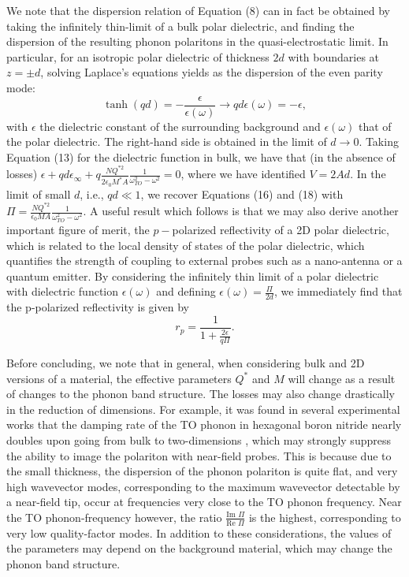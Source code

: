 \documentclass[superscriptaddress,reprint,prb]{revtex4-1}
\begin{document}
We note that the dispersion relation of Equation (8) can in fact be obtained by taking the infinitely thin-limit of a bulk polar dielectric, and finding the dispersion of the resulting phonon polaritons in the quasi-electrostatic limit. In particular, for an isotropic polar dielectric of thickness $2d$ with boundaries at $z=\pm d$, solving Laplace's equations yields as the dispersion of the even parity mode:
\begin{equation}
\tanh(qd) = -\frac{\epsilon}{\epsilon(\omega)} \rightarrow qd\epsilon(\omega) = -\epsilon,
\end{equation}
with $\epsilon$ the dielectric constant of the surrounding background and $\epsilon(\omega)$ that of the polar dielectric. The right-hand side is obtained in the limit of $d\rightarrow 0$. Taking Equation (13) for the dielectric function in bulk, we have that (in the absence of losses) $\epsilon + qd\epsilon_{\infty} + q\frac{NQ^{*2}}{2\epsilon_0 M^*A}\frac{1}{\omega_{TO}^2-\omega^2} = 0$, where we have identified $V = 2Ad$. In the limit of small $d$, i.e., $qd \ll 1$, we recover Equations (16) and (18) with $\Pi = \frac{NQ^{*2}}{\epsilon_0 MA}\frac{1}{\omega^2_{TO}-\omega^2}$. A useful result which follows is that we may also derive another important figure of merit, the $p-$polarized reflectivity of a 2D polar dielectric, which is related to the local density of states of the polar dielectric, which quantifies the strength of coupling to external probes such as a nano-antenna or a quantum emitter. By considering the infinitely thin limit of a polar dielectric with dielectric function $\epsilon(\omega)$ and defining $\epsilon(\omega) = \frac{\Pi}{2d}$, we immediately find that the p-polarized reflectivity is given by
\begin{equation}
r_p = \frac{1}{1+\frac{2\epsilon}{q\Pi}}.
\end{equation}

Before concluding, we note that in general, when considering bulk and 2D versions of a material, the effective parameters $Q^*$ and $M$ will change as a result of changes to the phonon band structure. The losses may also change drastically in the reduction of dimensions. For example, it was found in several experimental works that the damping rate of the TO phonon in hexagonal boron nitride nearly doubles upon going from bulk to two-dimensions \cite{gorbachev2011hunting,tran2016quantum}, which may strongly suppress the ability to image the polariton with near-field probes. This is because due to the small thickness, the dispersion of the phonon polariton is quite flat, and very high wavevector modes, corresponding to the maximum wavevector detectable by a near-field tip, occur at frequencies very close to the TO phonon frequency. Near the TO phonon-frequency however, the ratio $\frac{\text{Im }\Pi}{\text{Re }\Pi}$ is the highest, corresponding to very low quality-factor modes. In addition to these considerations, the values of the parameters may depend on the background material, which may change the phonon band structure. 
\end{document}
